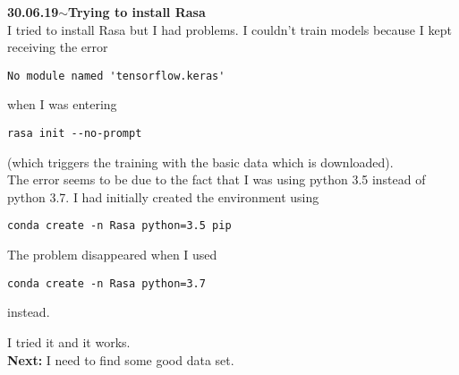 \documentclass[11pt,a4paper]{article}
\newenvironment{loggentry}[2]%
{\noindent\textbf{#1}\hspace{1cm}$\mathbf{\sim}$\text{ }\textbf{#2}\\}{\vspace{0.5cm}}
\begin{document}
\begin{loggentry}{30.06.19}{Trying to install Rasa}

I tried to install Rasa but I had problems. I couldn't train models because I kept receiving the error
\begin{verbatim}
No module named 'tensorflow.keras'
\end{verbatim}
when I was entering
\begin{verbatim}
rasa init --no-prompt
\end{verbatim}
(which triggers the training with the basic data which is downloaded).\\
The error seems to be due to the fact that I was using python 3.5 instead of python 3.7. I had initially created the environment using
\begin{verbatim}
conda create -n Rasa python=3.5 pip
\end{verbatim}
The problem disappeared when I used 
\begin{verbatim}
conda create -n Rasa python=3.7
\end{verbatim}
instead.

I tried it and it works.\\

\textbf{Next:} I need to find some good data set.

\end{loggentry}
\end{document}
